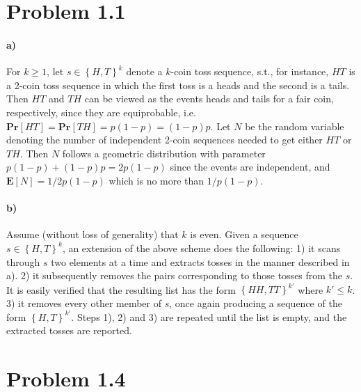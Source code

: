 \documentclass[12pt]{article}
\begin{document}
\section*{Problem 1.1}
\paragraph{a)} For $k \geq 1$, let $s \in \left\{ H,T \right\}^k$ denote a $k$-coin toss sequence, s.t., for instance, $HT$ is a 2-coin toss sequence in which the first toss is a heads and the second is a tails. Then $HT$ and $TH$ can be viewed as the events heads and tails for a fair coin, respectively, since they are equiprobable, i.e. $\textbf{Pr}\left[ HT \right] = \textbf{Pr}\left[ TH \right] = p(1-p)=(1-p)p$. Let $N$ be the random variable denoting the number of independent 2-coin sequences needed to get either $HT$ or $TH$. Then $N$ follows a geometric distribution with parameter $p(1-p) + (1-p)p = 2p(1-p)$ since the events are independent, and $\mathbf{E}\left[ N \right] = 1/2p(1-p)$ which is no more than $1/p(1-p)$.

\paragraph{b)} Assume (without loss of generality) that $k$ is even. Given a sequence $s \in \left\{ H,T \right\}^k$, an extension of the above scheme does the following: 1) it scans through $s$ two elements at a time and extracts tosses in the manner described in a). 2) it subsequently removes the pairs corresponding to those tosses from the $s$. It is easily verified that the resulting list has the form $\left\{ HH,TT \right\}^{k'}$ where $k' \leq k$. 3) it removes every other member of $s$, once again producing a sequence of the form $\left\{ H,T \right\}^{k'}$. Steps 1), 2) and 3) are repeated until the list is empty, and the extracted tosses are reported.

\section*{Problem 1.4}
\end{document}
